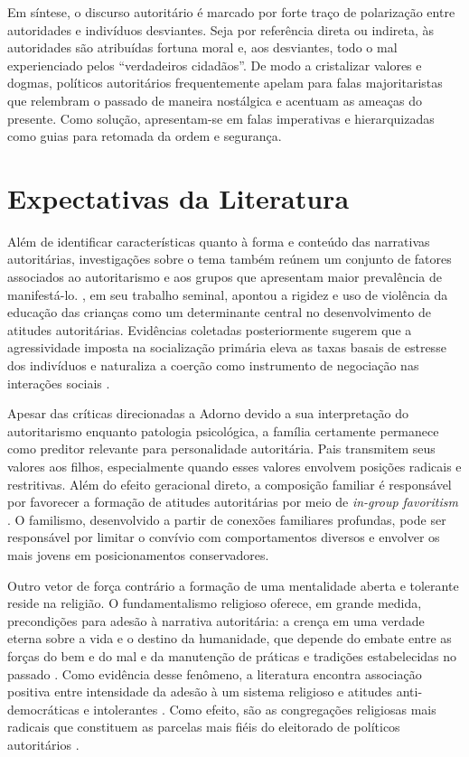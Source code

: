 \documentclass[
12pt,				%
openright,			%
twoside,			%
a4paper,			%
english,			%
french,				%
spanish,			%
brazil				%
]{abntex2}
\begin{document}
Em síntese, o discurso autoritário é marcado por forte traço de polarização entre autoridades e indivíduos desviantes. Seja por referência direta ou indireta, às autoridades são atribuídas fortuna moral e, aos desviantes, todo o mal experienciado pelos ``verdadeiros cidadãos''. De modo a cristalizar valores e dogmas, políticos autoritários frequentemente apelam para falas majoritaristas que relembram o passado de maneira nostálgica e acentuam as ameaças do presente. Como solução, apresentam-se em falas imperativas e hierarquizadas como guias para retomada da ordem e segurança. 

\section{Expectativas da Literatura}

Além de identificar características quanto à forma e conteúdo das narrativas autoritárias, investigações sobre o tema também reúnem um conjunto de fatores associados ao autoritarismo e aos grupos que apresentam maior prevalência de manifestá-lo. , em seu trabalho seminal, apontou a rigidez e uso de violência da educação das crianças como um determinante central no desenvolvimento de atitudes autoritárias. Evidências coletadas posteriormente sugerem que a agressividade imposta na socialização primária eleva as taxas basais de estresse dos indivíduos e naturaliza a coerção como instrumento de negociação nas interações sociais \cite{hopf1993authoritarians, van2009authoritarianism}.

Apesar das críticas direcionadas a Adorno devido a sua interpretação do autoritarismo enquanto patologia psicológica, a família certamente permanece como preditor relevante para personalidade autoritária. Pais transmitem seus valores aos filhos, especialmente quando esses valores envolvem posições radicais e restritivas. Além do efeito geracional direto, a composição familiar é responsável por favorecer a formação de atitudes autoritárias por meio de \emph{in-group favoritism} \cite{lewis2014common, altemeyer2006authoritarians}. O familismo, desenvolvido a partir de conexões familiares profundas, pode ser responsável por limitar o convívio com comportamentos diversos e envolver os mais jovens em posicionamentos conservadores.

Outro vetor de força contrário a formação de uma mentalidade aberta e tolerante reside na religião. O fundamentalismo religioso oferece, em grande medida, precondições para adesão à narrativa autoritária: a crença em uma verdade eterna sobre a vida e o destino da humanidade, que depende do embate entre as forças do bem e do mal e da manutenção de práticas e tradições estabelecidas no passado \cite{rokeach1956political,rokeach1960open}. Como evidência desse fenômeno, a literatura encontra associação positiva entre intensidade da adesão à um sistema religioso e atitudes anti-democráticas e intolerantes \cite{pereira2001sistemas,pereira2004sistemas,fuks2012atitudes}. Como efeito, são as congregações religiosas mais radicais que constituem as parcelas mais fiéis do eleitorado de políticos autoritários \cite{mudde2013exclusionary, betz2016against}.
\end{document}
